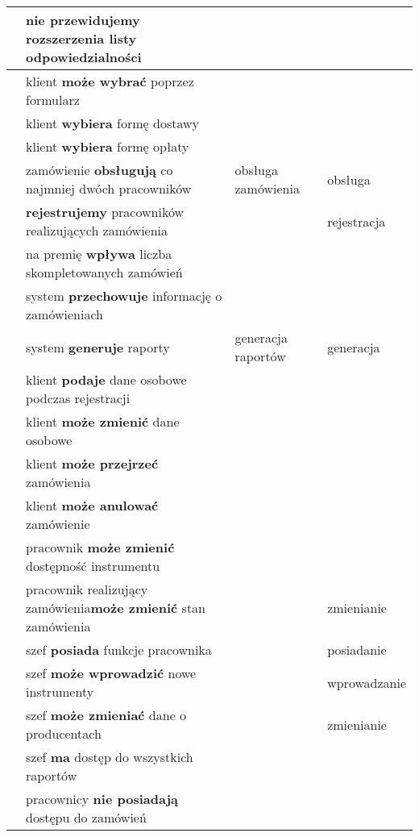 \documentclass[a4page]{article}
\begin{document}
\begin{table}[tp!]
\begin{adjustwidth}{-4.5cm}{}
\begin{tabular}{|l|l|l|l|}
				\hline
					\nextrow & \textbf{nie przewidujemy} rozszerzenia listy odpowiedzialności &  & \\
				\hline
					\nextrow & klient \textbf{może wybrać} poprzez formularz &  & \\
				\hline
					\nextrow & klient \textbf{wybiera} formę dostawy &  & \\
				\hline
					\nextrow & klient \textbf{wybiera} formę opłaty &  & \\
				\hline
					\nextrow & zamówienie \textbf{obsługują} co najmniej dwóch pracowników & obsługa zamówienia & obsługa\\
				\hline
					\nextrow & \textbf{rejestrujemy} pracowników realizujących zamówienia &  & rejestracja\\
				\hline
					\nextrow & na premię \textbf{wpływa} liczba skompletowanych zamówień &  & \\
				\hline
					\nextrow & system \textbf{przechowuje} informację o zamówieniach &  & \\
				\hline
					\nextrow & system \textbf{generuje} raporty & generacja raportów & generacja\\
				\hline
					\nextrow & klient \textbf{podaje} dane osobowe podczas rejestracji &  & \\
				\hline
					\nextrow & klient \textbf{może zmienić} dane osobowe &  & \\
				\hline
					\nextrow & klient \textbf{może przejrzeć} zamówienia &  & \\
				\hline
					\nextrow & klient \textbf{może anulować} zamówienie &  & \\
				\hline
					\nextrow & pracownik \textbf{może zmienić} dostępność instrumentu &  & \\
				\hline
					\nextrow & pracownik realizujący zamówienia\textbf{może zmienić} stan zamówienia  &  & zmienianie\\
				\hline
					\nextrow & szef \textbf{posiada} funkcje pracownika &  & posiadanie\\
				\hline
					\nextrow & szef \textbf{może wprowadzić} nowe instrumenty &  & wprowadzanie\\
				\hline
					\nextrow & szef \textbf{może zmieniać} dane o producentach &  & zmienianie\\
				\hline
					\nextrow & szef \textbf{ma} dostęp do wszystkich raportów &  & \\
				\hline
					\nextrow & pracownicy \textbf{nie posiadają} dostępu do zamówień &  & \\
				\hline

\end{tabular}
\end{adjustwidth}
\end{table}
\end{document}
